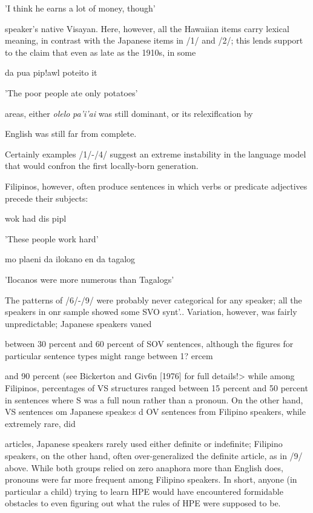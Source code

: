 'I think he earns a lot of money, though'

speaker's native Visayan. Here, however, all the Hawaiian items carry lexical meaning, in contrast with the Japanese items in /1/ and /2/; this lends support to the claim that even as late as the 1910s, in some

\ea\label{ex:7}

\glt
\z

da pua pip!awl poteito it

'The poor people ate only potatoes'

areas, either \textit{olelo} \textit{pa'i'ai }was still dominant, or its relexiflcation by

English was still far from complete.

Certainly examples /1/-/4/ suggest an extreme instability in the language model that would confron the first locally-born generation.

Filipinos, however, often produce sentences in which verbs or predicate adjectives precede their subjects:

\ea\label{ex:8}
 wok had dis pipl
\glt
\z

'These people work hard'


\ea\label{ex:9}
mo plaeni da ilokano en da tagalog
\glt
\z

'Ilocanos were more numerous than Tagalogs'

The patterns of /6/-/9/ were probably never categorical for any speaker; all the speakers in onr sample showed some SVO synt'.{\textquotedbl}{\textquotedbl}. Variation, however, was fairly unpredictable; Japanese speakers vaned

between 30 percent and 60 percent of SOV sentences, although the figures for particular sentence types might range between 1? ercem

and 90 percent (see Bickerton and Giv6n [1976] for full details!{\textgreater} while among Filipinos, percentages of VS structures ranged between 15 percent and 50 percent in sentences where S was a full noun rather than a pronoun. On the other hand, VS sentences om Japanese speake:s d OV sentences from Filipino speakers, while extremely rare, did

articles, Japanese speakers rarely used either definite or indefinite; Filipino speakers, on the other hand, often over-generalized the definite article, as in /9/ above. While both groups relied on zero anaphora more than English does, pronouns were far more frequent among Filipino speakers. In short, anyone (in particular a child) trying to learn HPE would have encountered formidable obstacles to even figuring out what the rules of HPE were supposed to be.

